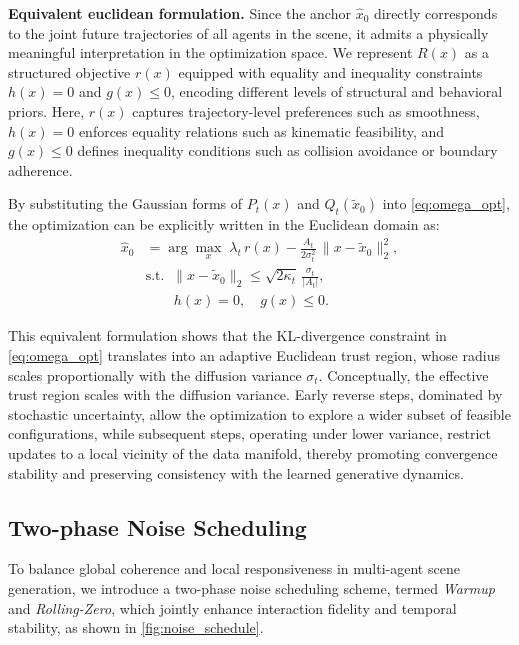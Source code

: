 \documentclass[10pt,twocolumn,letterpaper]{article}
\theoremstyle{plain}
\theoremstyle{remark}
\renewcommand{\paragraph}[1]{\vspace{.5em}\noindent\textbf{#1.}}
\begin{document}
\paragraph{Equivalent euclidean formulation}
Since the anchor $\hat{x}_0$ directly corresponds to the joint future trajectories of all agents in the scene, it admits a physically meaningful interpretation in the optimization space. We represent \(R(x)\) as a structured objective \(r(x)\) equipped with equality and inequality constraints \(h(x)=0\) and \(g(x)\le0\), encoding different levels of structural and behavioral priors. 
Here, \(r(x)\) captures trajectory-level preferences such as smoothness, 
\(h(x)=0\) enforces equality relations such as kinematic feasibility,  
and \(g(x)\le0\) defines inequality conditions such as collision avoidance or boundary adherence.

By substituting the Gaussian forms of \(P_t(x)\) and \(Q_t(\tilde{x}_0)\) into \cref{eq:omega_opt},  
the optimization can be explicitly written in the Euclidean domain as:
\begin{equation}
\begin{aligned}
\hat{x}_0
&=\arg\max_x\;
\lambda_t\, r(x)
-\frac{A_t}{2\sigma_t^2}\,\|x-\tilde{x}_0\|_2^2, \\
&\text{s.t.}\;\;
\|x-\tilde{x}_0\|_2
\le
\sqrt{2\kappa_t}\,\frac{\sigma_t}{|A_t|}, \\
&\qquad h(x)=0,\quad g(x)\le0.
\end{aligned}
\label{eq:euclid-form}
\end{equation}


This equivalent formulation shows that the KL-divergence constraint in \cref{eq:omega_opt} translates into an adaptive Euclidean trust region,  
whose radius scales proportionally with the diffusion variance \(\sigma_t\).  
Conceptually, the effective trust region scales with the diffusion variance.
Early reverse steps, dominated by stochastic uncertainty, allow the optimization to explore a wider subset of feasible configurations, while subsequent steps, operating under lower variance, restrict updates to a local vicinity of the data manifold,
thereby promoting convergence stability and preserving consistency with the learned generative dynamics.


\subsection{Two-phase Noise Scheduling}
\label{sec:noise_schedule}

To balance global coherence and local responsiveness in multi-agent scene generation,  
we introduce a two-phase noise scheduling scheme, termed \textit{Warmup} and \textit{Rolling-Zero}, which jointly enhance interaction fidelity and temporal stability, as shown in \cref{fig:noise_schedule}.
\end{document}
